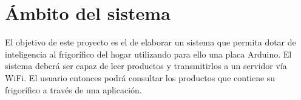 \section{Ámbito del sistema}

El objetivo de este proyecto es el de elaborar un sistema que permita dotar de inteligencia al frigorífico del hogar utilizando para ello una placa Arduino. El sistema deberá ser capaz de leer productos y transmitirlos a un servidor vía WiFi. El usuario entonces podrá consultar los productos que contiene su frigorífico a través de una aplicación.